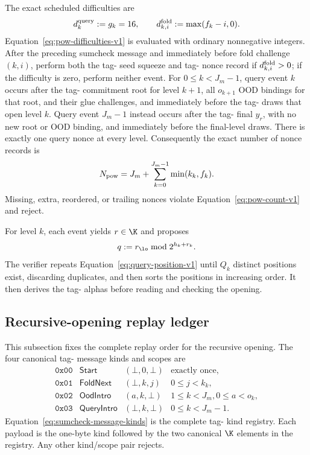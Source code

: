The exact scheduled difficulties are
\begin{equation}
 d^{\rm query}_k:=g_k=16,
 \qquad
 d^{\rm fold}_{k,i}:=\max(f_k-i,0).
 \label{eq:pow-difficulties-v1}
\end{equation}
Equation~\eqref{eq:pow-difficulties-v1} is evaluated with ordinary
nonnegative integers.  After the preceding sumcheck message and immediately
before fold challenge $(k,i)$, perform both the tag- seed squeeze
and tag- nonce record if $d^{\rm fold}_{k,i}>0$; if the difficulty
is zero, perform neither event.  For $0\le k<J_m-1$, query event $k$ occurs after the
tag- commitment root for level $k+1$, all $o_{k+1}$ OOD bindings
for that root, and their glue challenges, and immediately before the tag-
draws that open level $k$.  Query event $J_m-1$ instead occurs after the
tag- final $y_r$, with no new root or OOD binding, and immediately
before the final-level draws.  There is exactly one query nonce at every level.
Consequently the exact number of nonce records is
\begin{equation}
 N_{\rm pow}=J_m+\sum_{k=0}^{J_m-1}\min(k_k,f_k).
 \label{eq:pow-count-v1}
\end{equation}
Missing, extra, reordered, or trailing nonces violate
Equation~\eqref{eq:pow-count-v1} and reject.

For level $k$, each  event yields $r\in\K$ and proposes
\begin{equation}
 q:=r_{\lo}\bmod 2^{h_k+r_k}.
 \label{eq:query-position-v1}
\end{equation}
The verifier repeats Equation~\eqref{eq:query-position-v1} until $Q_k$
distinct positions exist, discarding duplicates, and then sorts the positions
in increasing order.  It then derives the tag- alphas before
reading and checking the opening.

\subsection{Recursive-opening replay ledger}
\label{sec:wire-recursive-ledger}

This subsection fixes the complete replay order for the recursive opening.
The four canonical tag- message kinds and scopes are
\begin{equation}
 \begin{array}{ccll}
  \mathtt{0x00}&\mathsf{Start}&(\bot,0,\bot)&\text{exactly once},\\
  \mathtt{0x01}&\mathsf{FoldNext}&(\bot,k,j)&0\le j<k_k,\\
  \mathtt{0x02}&\mathsf{OodIntro}&(a,k,\bot)&1\le k<J_m, 0\le a<o_k,\\
  \mathtt{0x03}&\mathsf{QueryIntro}&(\bot,k,\bot)&0\le k<J_m-1.
 \end{array}
 \label{eq:sumcheck-message-kinds}
\end{equation}
Equation~\eqref{eq:sumcheck-message-kinds} is the complete tag-
 kind registry.  Each payload is the one-byte kind followed by the
two canonical $\K$
elements in the registry.  Any other kind/scope pair rejects.

